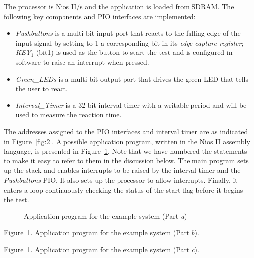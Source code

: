 \documentclass[11pt, twoside, pdftex]{article}
\begin{document}
The processor is Nios II/s and the application is loaded from SDRAM.
The following key components and PIO interfaces are implemented:
\begin{itemize}
\item {\it Pushbuttons} is a multi-bit input port that reacts to the falling edge of the
input signal by setting to 1 a corresponding bit in its {\it edge-capture register}; 
{\it KEY}$_1$ (bit1) is used as the button to start the test and is configured in software to raise an interrupt when pressed.
\item {\it Green\_LEDs} is a multi-bit output port that drives the green LED
that tells the user to react.
\item {\it Interval\_Timer} is a 32-bit interval timer with a writable period and will be used to measure the reaction time.
\end{itemize}
\noindent
The addresses assigned to the PIO interfaces and interval timer are as indicated in Figure~\ref{fig:2}. A possible application program, written in the Nios II assembly language,
is presented in Figure~\ref{fig:3}. Note that we have numbered the 
statements to make it easy to refer to them in the discussion below.
The main program sets up the stack and enables interrupts to be raised by the interval timer and the {\it Pushbuttons} PIO. It also sets up the processor to allow interrupts. Finally, it enters 
a loop continuously checking the status of the start flag before it begins the test.
%
\begin{figure}[H]
\begin{center}

	\caption{Application program for the example system (Part {\it a})}
	\label{fig:3}
\end{center}
\end{figure}
\newpage
\begin{center}

Figure~\ref*{fig:3}.  Application program for the example system (Part {\it b}).
\end{center}

\begin{center}

Figure~\ref*{fig:3}.  Application program for the example system (Part {\it c}).\\
\end{center}
\end{document}
